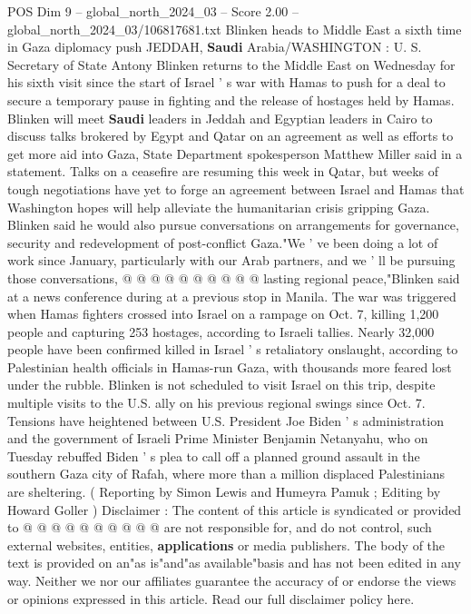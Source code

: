 \begin{textsample}{POS Dim 9 – global\_north\_2024\_03 – Score 2.00 – global\_north\_2024\_03/106817681.txt}  \label{ex:f9_pos_202}
Blinken heads to Middle East a sixth time in Gaza diplomacy push JEDDAH, \textbf{Saudi} Arabia/WASHINGTON : U.
S.
Secretary of State Antony Blinken returns to the Middle East on Wednesday for his sixth visit since the start of Israel ' s war with Hamas to push for a deal to secure a temporary pause in fighting and the release of hostages held by Hamas.
Blinken will meet \textbf{Saudi} leaders in Jeddah and Egyptian leaders in Cairo to discuss talks brokered by Egypt and Qatar on an agreement as well as efforts to get more aid into Gaza, State Department spokesperson Matthew Miller said in a statement.
Talks on a ceasefire are resuming this week in Qatar, but weeks of tough negotiations have yet to forge an agreement between Israel and Hamas that Washington hopes will help alleviate the humanitarian crisis gripping Gaza.
Blinken said he would also pursue conversations on arrangements for governance, security and redevelopment of post-conflict Gaza."We ' ve been doing a lot of work since January, particularly with our Arab partners, and we ' ll be pursuing those conversations, @ @ @ @ @ @ @ @ @ @ lasting regional peace,"Blinken said at a news conference during at a previous stop in Manila.
The war was triggered when Hamas fighters crossed into Israel on a rampage on Oct. 7, killing 1,200 people and capturing 253 hostages, according to Israeli tallies.
Nearly 32,000 people have been confirmed killed in Israel ' s retaliatory onslaught, according to Palestinian health officials in Hamas-run Gaza, with thousands more feared lost under the rubble.
Blinken is not scheduled to visit Israel on this trip, despite multiple visits to the U.S. ally on his previous regional swings since Oct. 7.
Tensions have heightened between U.S.
President Joe Biden ' s administration and the government of Israeli Prime Minister Benjamin Netanyahu, who on Tuesday rebuffed Biden ' s plea to call off a planned ground assault in the southern Gaza city of Rafah, where more than a million displaced Palestinians are sheltering. ( Reporting by Simon Lewis and Humeyra Pamuk ; Editing by Howard Goller ) Disclaimer : The content of this article is syndicated or provided to @ @ @ @ @ @ @ @ @ @ are not responsible for, and do not control, such external websites, entities, \textbf{applications} or media publishers.
The body of the text is provided on an"as is"and"as available"basis and has not been edited in any way.
Neither we nor our affiliates guarantee the accuracy of or endorse the views or opinions expressed in this article.
Read our full disclaimer policy here.

\end{textsample}
